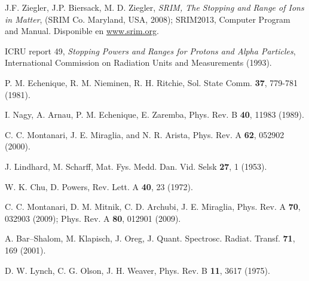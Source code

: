 \begin{thebibliography}{9}
J.F. Ziegler, J.P. Biersack, M. D. Ziegler, 
\textit{SRIM, The Stopping and Range of Ions in Matter}, 
(SRIM Co. Maryland, USA, 2008); 
SRIM2013, Computer Program and Manual. Disponible en \href{https://www.srim.org}{www.srim.org}.

ICRU report 49, \textit{Stopping Powers and Ranges for Protons and Alpha Particles},
International Commission on Radiation Units and Measurements (1993).

P. M. Echenique, R. M. Nieminen, R. H. Ritchie, 
Sol. State Comm. \textbf{37}, 779-781 (1981).

I. Nagy, A. Arnau, P. M. Echenique, E. Zaremba, 
Phys. Rev. B \textbf{40}, 11983 (1989).

C. C. Montanari, J. E. Miraglia, and N. R. Arista, 
Phys. Rev. A \textbf{62}, 052902 (2000).

J. Lindhard, M. Scharff,  
Mat. Fys. Medd. Dan. Vid. Selsk  \textbf{27}, 1 (1953).

W. K. Chu, D. Powers, 
Rev. Lett. A \textbf{40}, 23 (1972).

C. C. Montanari, D. M. Mitnik, C. D. Archubi, J. E. Miraglia, 
Phys. Rev. A \textbf{70}, 032903 (2009); 
Phys. Rev. A \textbf{80}, 012901 (2009).

\begin{comment}

\bibitem{Montanari:09}
C. C. Montanari, C. D. Archubi, D. M. Mitnik, J. E. Miraglia,
Phys. Rev. A \textbf{79}, 032903 (2009);

\bibitem{Montanari:11}
C.C. Montanari, D. M. Mitnik, J. E. Miraglia,
Rad. Eff. Defects Sol. \textbf{166}, 338 (2011).

\bibitem{Oswald:18}
M. Oswal, Sunil Kumar, Udai Singh, G. Singhe, K. P. Singh, D. Mehta,
D. Mitnik, C. C. Montanari, T.Nandi,
Nucl. Instr. Meth. Phys.
Res. B \textbf{416}, 110 (2018).

\bibitem{Montanari:19}
A. M. P. Mendez, C. C. Montanari, D. M. Mitnik, J. E. Miraglia,
\textit{en preparación}.

\end{comment}


A. Bar--Shalom, M. Klapisch, J. Oreg,
J. Quant. Spectrosc. Radiat. Transf. \textbf{71}, 169 (2001).

D. W. Lynch, C. G. Olson, J. H. Weaver,
Phys. Rev. B \textbf{11}, 3617 (1975).


\end{thebibliography}
